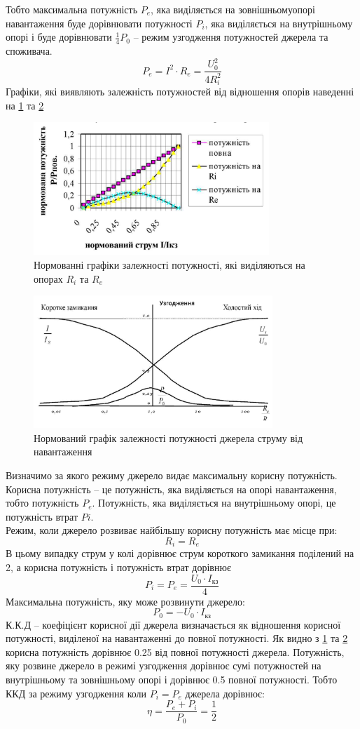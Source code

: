 \documentclass[a4paper,12pt]{article}
\begin{document}
\begin{justify}
	Тобто максимальна потужність $P_e$, яка виділяється на зовнішньомуопорі навантаження буде дорівнювати потужності $P_i$, яка виділяється на внутрішньому опорі і буде дорівнювати $\frac14 P_0$ – режим узгодження потужностей джерела та споживача.
	$$P_e=I^2\cdot R_e=\dfrac{U_0^2}{4R_i^2}$$
	Графіки, які виявляють залежність потужностей від відношення опорів наведенні на \ref{fig:3} та \ref{fig:4}
	\begin{figure}[!h]
		\centering
		\includegraphics[height=50mm]{media/graph3.png}
		\caption{Нормованні графіки залежності потужності, які виділяються на опорах $R_i$ та $R_e$ }
		\label{fig:3}
	\end{figure}\newpage
	\begin{figure}[!h]
		\centering
		\includegraphics[height=50mm]{media/graph4.png}
		\caption{Нормований графік залежності потужності джерела струму від навантаження}
		\label{fig:4}
	\end{figure}
	Визначимо за якого режиму джерело видає максимальну корисну потужність. 
	Корисна потужність – це потужність, яка виділяється на опорі навантаження, тобто потужність $P_e$. Потужність, яка виділяється на внутрішньому опорі, це потужність втрат $Pi.$ \\
	Режим, коли джерело розвиває найбільшу корисну потужність має місце при:
	$$R_i=R_e$$
 	В цьому випадку струм у колі дорівнює струм короткого замикання поділений на 2, а корисна потужність і потужність втрат дорівнює
 	$$P_i=P_e=\dfrac{U_0\cdot I_{\textrm{кз}}}{4}$$
 	Максимальна потужність, яку може розвинути джерело:
 	$$P_0=-U_0\cdot I_{\textrm{кз}}$$
	К.К.Д – коефіцієнт корисної дії джерела визначається як відношення корисної потужності, виділеної на навантаженні до повної потужності. Як видно з \ref{fig:3} та \ref{fig:4} корисна потужність дорівнює 0.25 від повної потужності джерела. Потужність, яку розвине джерело в режимі узгодження дорівнює сумі потужностей на внутрішньому та зовнішньому опорі і дорівнює 0.5 повної потужності. Тобто ККД за режиму узгодження коли $P_i = P_e$ джерела дорівнює: 
	$$\eta=\dfrac{P_e+P_i}{P_0}=\dfrac12$$

\end{justify}
\end{document}
